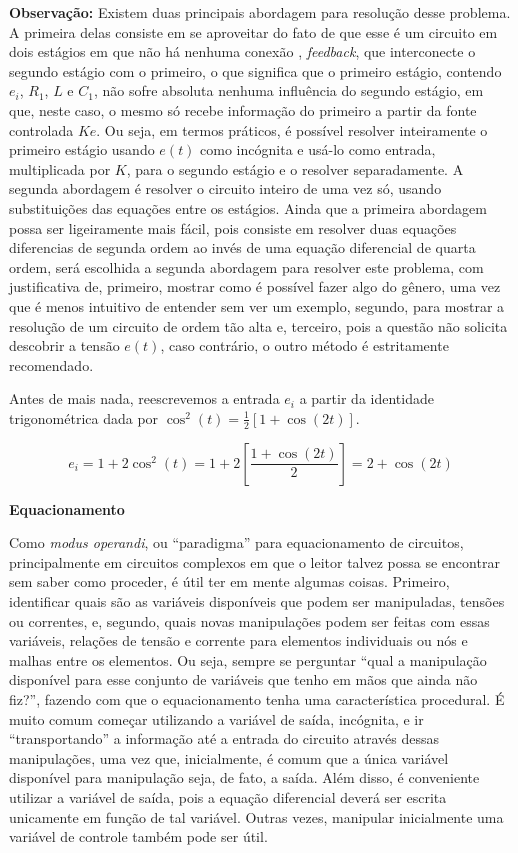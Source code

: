 \documentclass{article}
\numberwithin{equation}{section}
\begin{document}
\textbf{Observação:} Existem duas principais abordagem para resolução desse problema. A primeira delas consiste em se aproveitar do fato de que esse é um circuito em dois estágios em que não há nenhuma conexão , \textit{feedback}, que interconecte o segundo estágio com o primeiro, o que significa que o primeiro estágio, contendo $e_i$, $R_1$, $L$ e $C_1$, não sofre absoluta nenhuma influência do segundo estágio, em que, neste caso, o mesmo só recebe informação do primeiro a partir da fonte controlada $Ke$. Ou seja, em termos práticos, é possível resolver inteiramente o primeiro estágio usando $e(t)$ como incógnita e usá-lo como entrada, multiplicada por $K$, para o segundo estágio e o resolver separadamente. A segunda abordagem é resolver o circuito inteiro de uma vez só, usando substituições das equações entre os estágios. Ainda que a primeira abordagem possa ser ligeiramente mais fácil, pois consiste em resolver duas equações diferencias de segunda ordem ao invés de uma equação diferencial de quarta ordem, será escolhida a segunda abordagem para resolver este problema, com justificativa de, primeiro, mostrar como é possível fazer algo do gênero, uma vez que é menos intuitivo de entender sem ver um exemplo, segundo, para mostrar a resolução de um circuito de ordem tão alta e, terceiro, pois a questão não solicita descobrir a tensão $e(t)$, caso contrário, o outro método é estritamente recomendado.

\vspace{2mm}

\noindent Antes de mais nada, reescrevemos a entrada $e_i$ a partir da identidade trigonométrica dada por $\cos^2(t) = \frac{1}{2}[1+\cos(2t)]$.


\begin{equation*}
    e_i =  1 + 2\cos^2(t) = 1 + 2\left[\dfrac{1 + \cos(2t)}{2}\right] = 2 + \cos(2t)
\end{equation*}

\begin{center}
    \textbf{Equacionamento}
\end{center}

Como \textit{modus operandi}, ou ``paradigma'' para equacionamento de circuitos, principalmente em circuitos complexos em que o leitor talvez possa se encontrar sem saber como proceder, é útil ter em mente algumas coisas. Primeiro, identificar quais são as variáveis disponíveis que podem ser manipuladas, tensões ou correntes, e, segundo, quais novas manipulações podem ser feitas com essas variáveis, relações de tensão e corrente para elementos individuais ou nós e malhas entre os elementos. Ou seja, sempre se perguntar ``qual a manipulação disponível para esse conjunto de variáveis que tenho em mãos que ainda não fiz?'', fazendo com que o equacionamento tenha uma característica procedural. É muito comum começar utilizando a variável de saída, incógnita, e ir ``transportando'' a informação até a entrada do circuito através dessas manipulações, uma vez que, inicialmente, é comum que a única variável disponível para manipulação seja, de fato, a saída. Além disso, é conveniente utilizar a variável de saída, pois a equação diferencial deverá ser escrita unicamente em função de tal variável. Outras vezes, manipular inicialmente uma variável de controle também pode ser útil.
\end{document}
